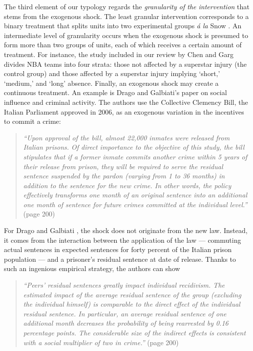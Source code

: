 \documentclass[11pt]{article}
\begin{document}
\begin{refsection}
The third element of our typology regards the \textit{granularity of the 
intervention} that stems from the exogenous shock. The least granular 
intervention corresponds to a binary treatment that splits units into 
two experimental groups \textit{\'a la} Snow \autocite*{snow_1855}.
An intermediate level of granularity occurs when the exogenous shock 
is presumed to form more than two groups of units, each of which receives
a certain amount of treatment. For instance, the study included in our
review by Chen and Garg \autocite*{chen20181239} divides NBA teams into 
four strata: those not affected by a superstar injury (the control group) and 
those affected by a superstar injury implying `short,' `medium,' and `long' 
absence. Finally, an exogenous shock may create a continuous treatment. 
An example is  Drago and Galbiati's \autocite*{drago_galbiati_2012} paper
on social influence and criminal activity. The authors use the Collective 
Clemency Bill, the Italian Parliament approved in 2006, as an exogenous 
variation in the incentives to commit a crime:

\begin{quote}
  \textit{
    ``Upon approval of the bill, almost 22,000 inmates were released from Italian
    prisons. Of direct importance to the objective of this study, the bill
    stipulates that if a former inmate commits another crime within 5 years of
    their release from prison, they will be required to serve the residual
    sentence suspended by the pardon (varying from 1 to 36 months) in addition
    to the sentence for the new crime. In other words, the policy effectively
    transforms one month of an original sentence into an additional one month of
    sentence for future crimes committed at the individual level.''
  }
  (page 200)
\end{quote}

For Drago and Galbiati \autocite*{drago_galbiati_2012}, the shock does not
originate from the new law. Instead, it comes from the interaction between the
application of the law 
--- commuting actual sentences in expected sentences for forty percent of 
the Italian prison population --- and a prisoner's residual sentence at date of
release. Thanks to such an ingenious empirical strategy, the authors can show

\begin{quote}
  \textit{
    ``Peers' residual sentences greatly impact individual recidivism. The estimated
    impact of the average residual sentence of the group (excluding the
    individual himself) is comparable to the direct effect of the individual
    residual sentence. In particular, an average residual sentence of one
    additional month decreases the probability of being rearrested by 0.16
    percentage points. The considerable size of the indirect effects is
    consistent with a social multiplier of two in crime.''
  } (page 200)
\end{quote}



\end{refsection}
\end{document}
